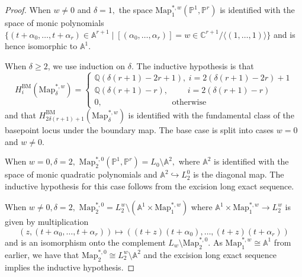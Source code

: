 \documentclass[12pt,reqno]{amsart}
\theoremstyle{definition}
\theoremstyle{definition}
\theoremstyle{definition}
\theoremstyle{definition}
\begin{document}
\begin{proof}
  When $w\neq 0$ and $\delta = 1,$ the space $\mathrm{Map}_{1}^{*,w}(\mathbb{P}^1, \mathbb{P}^r)$ is identified with the space of monic polynomials $\{(t + \alpha_0,\dots, t+ \alpha_r)\in \mathbb{A}^{r+1}\mid [(\alpha_0,\dots, \alpha_r)]=w\in \mathbb{C}^{r+1}/\langle (1,\dots, 1)\rangle\}$ and is hence isomorphic to $\mathbb{A}^1.$

  When $\delta\geq 2$, we use induction on $\delta.$ The inductive hypothesis is that $$H_i^{\mathrm{BM}}(\mathrm{Map}_{{\delta}}^{*, w})=\begin{cases*}
    \mathbb{Q}(\delta(r+1)-2r+1), \hspace{3pt} i = 2(\delta(r+1)-2r)+1\\
    \mathbb{Q}(\delta(r+1)-r), \hspace{28pt} i=2(\delta(r+1)-r) \\
    0, \hspace{101pt} \text{otherwise}
  \end{cases*}$$ and that $H^{\mathrm{BM}}_{2\delta(r+1)+1}(\mathrm{Map}_{{\delta}}^{*, w})$ is identified with the fundamental class of the basepoint locus under the boundary map. The base case is split into cases $w = 0$ and $w\neq 0.$

  When $w = 0,\delta = 2,$ $\mathrm{Map}_{2}^{*,0}(\mathbb{P}^1, \mathbb{P}^r) = L_0\setminus \mathbb{A}^2,$ where $\mathbb{A}^2$ is identified with the space of monic quadratic polynomials and $\mathbb{A}^2\hookrightarrow L_{2}^{0}$ is the diagonal map. The inductive hypothesis for this case follows from the excision long exact sequence.

  When $w \neq 0,\delta =2,$ $\mathrm{Map}_{2}^{*,0} = L_{2}^{w}\setminus (\mathbb{A}^1\times \mathrm{Map}_{1}^{*,w})$ where $\mathbb{A}^1\times \mathrm{Map}_{1}^{*,w}\to  L_{2}^{w}$ is given by multiplication $$(z, (t+\alpha_0,\dots, t+\alpha_r))\mapsto ((t+z)(t+\alpha_0),\dots, (t+z)(t+\alpha_r))$$ and is an isomorphism onto the complement $ L_{w}\setminus \mathrm{Map}_{2}^{*,0}$. As $\mathrm{Map}_{1}^{*,w}\cong \mathbb{A}^1$ from earlier, we have that $\mathrm{Map}_{2}^{*,0}\cong L_{2}^{w}\setminus \mathbb{A}^2$ and the excision long exact sequence implies the inductive hypothesis.
  

\end{proof}
\end{document}

